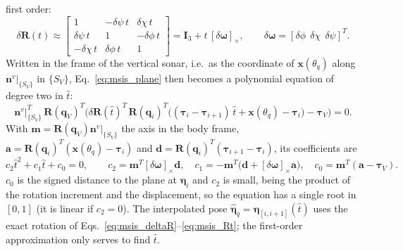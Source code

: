 first order:
\begin{equation}                         %
  \delta\mathbf{R}(t) \approx
  \begin{bmatrix} 1 & -\delta\psi\, t & \delta\chi\, t \\ \delta\psi\, t & 1 & -\delta\phi\, t \\ -\delta\chi\, t & \delta\phi\, t & 1 \end{bmatrix}
  = \mathbf{I}_3 + t\,[\delta\boldsymbol{\omega}]_\times, \qquad
  \delta\boldsymbol{\omega} = [\delta\phi\ \ \delta\chi\ \ \delta\psi]^T.
  \label{eq:msis_firstorder}
\end{equation}
Written in the frame of the vertical sonar, i.e.\ as the coordinate of $\mathbf{x}(\theta_q)$ along
$\mathbf{n}^v|_{\{S_V\}}$ in $\{S_V\}$, Eq.~\eqref{eq:msis_plane} then becomes a polynomial equation
of degree two in $\hat{t}$:
\begin{equation}                         %
  \mathbf{n}^{v}|_{\{S_V\}}^T\, \mathbf{R}(\mathbf{q}_V)^T \Big( \delta\mathbf{R}(\hat{t})^T\,
  \mathbf{R}(\mathbf{q}_i)^T \big( (\boldsymbol{\tau}_i - \boldsymbol{\tau}_{i+1})\, \hat{t} + \mathbf{x}(\theta_q) -
  \boldsymbol{\tau}_i \big) - \boldsymbol{\tau}_V \Big) = 0.
  \label{eq:msis_quadratic}
\end{equation}
With $\mathbf{m} = \mathbf{R}(\mathbf{q}_V)\mathbf{n}^v|_{\{S_V\}}$ the axis in the body frame,
$\mathbf{a} = \mathbf{R}(\mathbf{q}_i)^T(\mathbf{x}(\theta_q) - \boldsymbol{\tau}_i)$ and
$\mathbf{d} = \mathbf{R}(\mathbf{q}_i)^T(\boldsymbol{\tau}_{i+1} - \boldsymbol{\tau}_i)$, its coefficients
are
\begin{equation}                         %
  c_2 \hat{t}^2 + c_1 \hat{t} + c_0 = 0, \qquad
  c_2 = \mathbf{m}^T [\delta\boldsymbol{\omega}]_\times \mathbf{d}, \quad
  c_1 = -\mathbf{m}^T \big(\mathbf{d} + [\delta\boldsymbol{\omega}]_\times \mathbf{a}\big), \quad
  c_0 = \mathbf{m}^T (\mathbf{a} - \boldsymbol{\tau}_V).
  \label{eq:msis_coeffs}
\end{equation}
$c_0$ is the signed distance to the plane at $\boldsymbol{\eta}_i$ and $c_2$ is small, being the
product of the rotation increment and the displacement, so the equation has a single root in
$[0, 1]$ (it is linear if $c_2 = 0$). The interpolated pose
$\hat{\boldsymbol{\eta}}_q = \boldsymbol{\eta}_{[i,i+1]}(\hat{t})$ uses the exact rotation of
Eqs.~\eqref{eq:msis_deltaR}--\eqref{eq:msis_Rt}; the first-order approximation only serves to find
$\hat{t}$.

